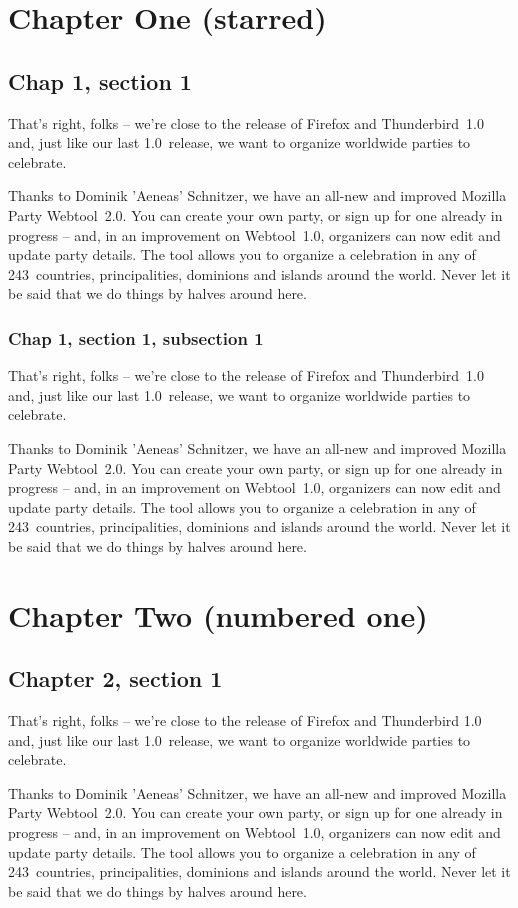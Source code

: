 \documentclass[12pt,a4paper]{report}
\begin{document}
\dominitoc \tableofcontents
\chapter*{Chapter One (starred)}
\minitoc
\section{Chap 1, section 1}
That's right, folks -- we're close to the release of Firefox and
Thunderbird~1.0 and, just like our last 1.0~release, we want to organize
worldwide parties to celebrate.

Thanks to Dominik 'Aeneas' Schnitzer, we have an all-new and improved
Mozilla Party Webtool~2.0. You can create your own party, or sign up for
one already in progress -- and, in an improvement on Webtool~1.0,
organizers can now edit and update party details. The tool allows you to
organize a celebration in any of 243~countries, principalities,
dominions and islands around the world. Never let it be said that we do
things by halves around here.

\subsection{Chap 1, section 1, subsection 1}
That's right, folks -- we're close to the release of Firefox and
Thunderbird~1.0 and, just like our last 1.0~release, we want to organize
worldwide parties to celebrate.

Thanks to Dominik 'Aeneas' Schnitzer, we have an all-new and improved
Mozilla Party Webtool~2.0. You can create your own party, or sign up for
one already in progress -- and, in an improvement on Webtool~1.0,
organizers can now edit and update party details. The tool allows you to
organize a celebration in any of 243~countries, principalities,
dominions and islands around the world. Never let it be said that we do
things by halves around here.
\chapter{Chapter Two (numbered one)}
\minitoc
\section{Chapter 2, section 1}
That's right, folks -- we're close to the release of Firefox and
Thunderbird 1.0 and, just like our last 1.0~release, we want to organize
worldwide parties to celebrate.

Thanks to Dominik 'Aeneas' Schnitzer, we have an all-new and improved
Mozilla Party Webtool~2.0. You can create your own party, or sign up for
one already in progress -- and, in an improvement on Webtool~1.0,
organizers can now edit and update party details. The tool allows you to
organize a celebration in any of 243~countries, principalities,
dominions and islands around the world. Never let it be said that we do
things by halves around here.
\end{document}
